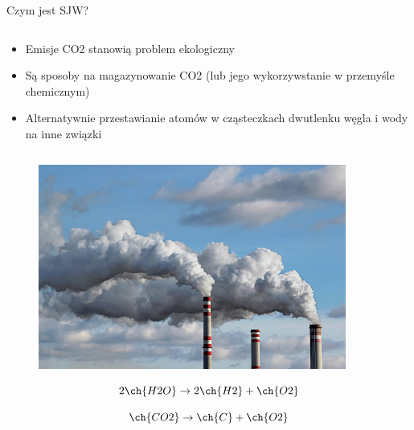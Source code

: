 \begin{columnframe}{Czym jest SJW?}
    \begin{column}{0.5\textwidth}
        \begin{itemize}
            \item Emisje CO2 stanowią problem ekologiczny
            \item Są sposoby na magazynowanie CO2 (lub jego wykorzywstanie w przemyśle chemicznym)
            \item Alternatywnie przestawianie atomów w cząsteczkach dwutlenku węgla i wody na inne związki
        \end{itemize}
    \end{column}
    \begin{column}{0.5\textwidth}
        \begin{figure}
            \centering
            \includegraphics[width=0.9\textwidth, frame]{images/industrial_polution_stock_image.jpg}
        \end{figure}

        \begin{equation*}
            2\ch{H2O} \rightarrow 2\ch{H2} + \ch{O2}
        \end{equation*}

        \begin{equation*}
            \ch{CO2} \rightarrow \ch{C} + \ch{O2}
        \end{equation*}
    \end{column}
\end{columnframe}

